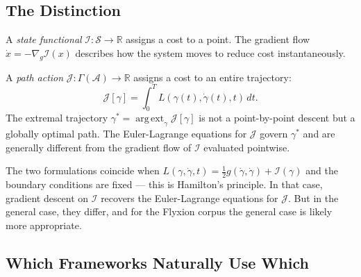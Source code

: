 \documentclass[11pt, a4paper]{article}
\begin{document}
\subsection{The Distinction}

A \emph{state functional} $\mathcal{I}: \mathcal{S} \to \mathbb{R}$
assigns a cost to a point. The gradient flow $\dot{x} =
-\nabla_g \mathcal{I}(x)$ describes how the system moves to reduce
cost instantaneously.

A \emph{path action} $\mathcal{J}: \Gamma(\mathcal{A}) \to \mathbb{R}$
assigns a cost to an entire trajectory:
\[
  \mathcal{J}[\gamma] = \int_0^T L(\gamma(t), \dot\gamma(t), t)\, dt.
\]
The extremal trajectory $\gamma^* = \operatorname{arg\,ext}_\gamma
\mathcal{J}[\gamma]$ is not a point-by-point descent but a globally
optimal path. The Euler-Lagrange equations for $\mathcal{J}$ govern
$\gamma^*$ and are generally different from the gradient flow of
$\mathcal{I}$ evaluated pointwise.

The two formulations coincide when $L(\gamma, \dot\gamma, t) =
\frac{1}{2}g(\dot\gamma, \dot\gamma) + \mathcal{I}(\gamma)$ and
the boundary conditions are fixed — this is Hamilton's principle.
In that case, gradient descent on $\mathcal{I}$ recovers the
Euler-Lagrange equations for $\mathcal{J}$. But in the general case,
they differ, and for the Flyxion corpus the general case is likely more
appropriate.

\subsection{Which Frameworks Naturally Use Which}
\end{document}
